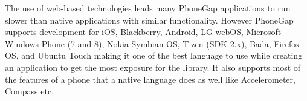 The use of web-based technologies leads many PhoneGap applications
to run slower than native applications with similar functionality.
However PhoneGap supports development for iOS, Blackberry, Android,
LG webOS, Microsoft Windows Phone (7 and 8), Nokia Symbian OS, Tizen
(SDK 2.x), Bada, Firefox OS, and Ubuntu Touch making it one of the
best language to use while creating an application to get the most
exposure for the library. It also supports most of the features of
a phone that a native language does as well like Accelerometer, Compass
etc.



